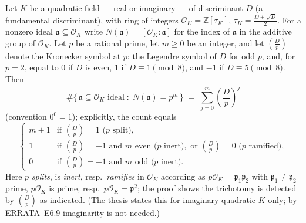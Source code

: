 
\begin{proposition}
  \label{prop-3-1-1}
  Let $K$ be a quadratic field --- real or imaginary --- of discriminant $D$ (a
  fundamental discriminant), with ring of integers
  $\mathcal{O}_K = \mathbb{Z}[\tau_K]$, $\tau_K = \tfrac{D+\sqrt{D}}{2}$. For a nonzero
  ideal $\mathfrak{a} \subseteq \mathcal{O}_K$ write
  $N(\mathfrak{a}) = [\mathcal{O}_K : \mathfrak{a}]$ for the index of $\mathfrak{a}$ in the
  additive group of $\mathcal{O}_K$. Let $p$ be a rational prime, let $m \ge 0$ be an
  integer, and let $\left(\frac{D}{p}\right)$ denote the Kronecker symbol at $p$: the
  Legendre symbol of $D$ for odd $p$, and, for $p = 2$, equal to $0$ if $D$ is even, $1$
  if $D \equiv 1 \pmod 8$, and $-1$ if $D \equiv 5 \pmod 8$. Then
  \[
    \#\bigl\{\, \mathfrak{a} \subseteq \mathcal{O}_K \text{ ideal} \;:\;
      N(\mathfrak{a}) = p^m \,\bigr\}
    \;=\; \sum_{j=0}^{m} \left(\frac{D}{p}\right)^{\!j}
  \]
  (convention $0^0 = 1$); explicitly, the count equals
  \[
    \begin{cases}
      m + 1
        & \text{if } \left(\frac{D}{p}\right) = 1 \text{ ($p$ split)},\\[3pt]
      1
        & \text{if } \left(\frac{D}{p}\right) = -1 \text{ and } m \text{ even ($p$ inert)},
          \text{ or } \left(\frac{D}{p}\right) = 0 \text{ ($p$ ramified)},\\[3pt]
      0
        & \text{if } \left(\frac{D}{p}\right) = -1 \text{ and } m \text{ odd ($p$ inert)}.
    \end{cases}
  \]
  Here $p$ \emph{splits}, is \emph{inert}, resp.\ \emph{ramifies} in $\mathcal{O}_K$
  according as $p\mathcal{O}_K = \mathfrak{p}_1\mathfrak{p}_2$ with
  $\mathfrak{p}_1 \neq \mathfrak{p}_2$ prime, $p\mathcal{O}_K$ is prime, resp.\
  $p\mathcal{O}_K = \mathfrak{p}^2$; the proof shows the trichotomy is detected by
  $\left(\frac{D}{p}\right)$ as indicated. (The thesis states this for imaginary quadratic
  $K$ only; by ERRATA~E6.9 imaginarity is not needed.)
\end{proposition}

